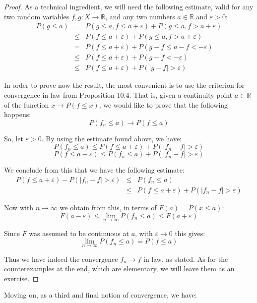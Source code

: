 \documentclass[12pt]{amsbook}
\begin{document}
\begin{proof}
As a technical ingredient, we will need the following estimate, valid for any two random variables $f,g:X\to\mathbb R$, and any two numbers $a\in\mathbb R$ and $\varepsilon>0$:
\begin{eqnarray*}
P(g\leq a)
&=&P(g\leq a,f\leq a+\varepsilon)+P(g\leq a,f>a+\varepsilon)\\
&\leq&P(f\leq a+\varepsilon)+P(g\leq a,f>a+\varepsilon)\\
&=&P(f\leq a+\varepsilon)+P(g-f\leq a-f<-\varepsilon)\\
&\leq&P(f\leq a+\varepsilon)+P(g-f<-\varepsilon)\\
&\leq&P(f\leq a+\varepsilon)+P(|g-f|>\varepsilon)
\end{eqnarray*}

In order to prove now the result, the most convenient is to use the criterion for convergence in law from Proposition 10.4. That is, given a continuity point $a\in\mathbb R$ of the function $x\to P(f\leq x)$, we would like to prove that the following happens:
$$P(f_n\leq a)\to P(f\leq a)$$

So, let $\varepsilon>0$. By using the estimate found above, we have:
$$P(f_n\leq a)\leq P(f\leq a+\varepsilon)+P(|f_n-f|>\varepsilon)$$
$$P(f\leq a-\varepsilon)\leq P(f_n\leq a)+P(|f_n-f|>\varepsilon)$$

We conclude from this that we have the following estimate:
\begin{eqnarray*}
P(f\leq a+\varepsilon)-P(|f_n-f|>\varepsilon)
&\leq&P(f_n\leq a)\\
&\leq&P(f\leq a+\varepsilon)+P(|f_n-f|>\varepsilon)
\end{eqnarray*}

Now with $n\to\infty$ we obtain from this, in terms of $F(a)=P(x\leq a)$:
$$F(a-\varepsilon)\leq\lim_{n\to\infty}P(f_n\leq a)\leq F(a+\varepsilon)$$

Since $F$ was assumed to be continuous at $a$, with $\varepsilon\to 0$ this gives:
$$\lim_{n\to\infty}P(f_n\leq a)=P(f\leq a)$$

Thus we have indeed the convergence $f_n\to f$ in law, as stated. As for the counterexamples at the end, which are elementary, we will leave them as an exercise.
\end{proof}


Moving on, as a third and final notion of convergence, we have:
\end{document}
